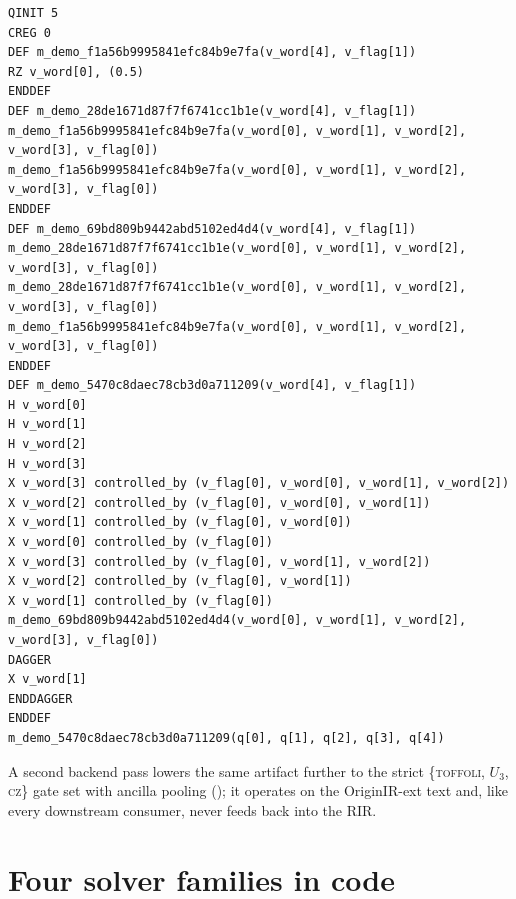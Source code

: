 \begin{lstlisting}[style=pyqir, caption={OriginIR-ext export (verbatim \texttt{export\_originir} output) of the module \texttt{demo\{word: UInt(4), flag: Bits(1)\}} that applies \texttt{h} to \texttt{word}, adds the constant 3 under control of \texttt{flag}, repeats \texttt{rz(0.5)} on \texttt{word[0]} five times, and adjoints \texttt{x} on \texttt{word[1]}.  The three \texttt{m\_demo\_*} definitions are the logarithmic chain for count 5; note the propagated \texttt{v\_flag[0]} argument replacing per-gate controls inside called modules.}, label={lst:originir-lowered}]
QINIT 5
CREG 0
DEF m_demo_f1a56b9995841efc84b9e7fa(v_word[4], v_flag[1])
RZ v_word[0], (0.5)
ENDDEF
DEF m_demo_28de1671d87f7f6741cc1b1e(v_word[4], v_flag[1])
m_demo_f1a56b9995841efc84b9e7fa(v_word[0], v_word[1], v_word[2], v_word[3], v_flag[0])
m_demo_f1a56b9995841efc84b9e7fa(v_word[0], v_word[1], v_word[2], v_word[3], v_flag[0])
ENDDEF
DEF m_demo_69bd809b9442abd5102ed4d4(v_word[4], v_flag[1])
m_demo_28de1671d87f7f6741cc1b1e(v_word[0], v_word[1], v_word[2], v_word[3], v_flag[0])
m_demo_28de1671d87f7f6741cc1b1e(v_word[0], v_word[1], v_word[2], v_word[3], v_flag[0])
m_demo_f1a56b9995841efc84b9e7fa(v_word[0], v_word[1], v_word[2], v_word[3], v_flag[0])
ENDDEF
DEF m_demo_5470c8daec78cb3d0a711209(v_word[4], v_flag[1])
H v_word[0]
H v_word[1]
H v_word[2]
H v_word[3]
X v_word[3] controlled_by (v_flag[0], v_word[0], v_word[1], v_word[2])
X v_word[2] controlled_by (v_flag[0], v_word[0], v_word[1])
X v_word[1] controlled_by (v_flag[0], v_word[0])
X v_word[0] controlled_by (v_flag[0])
X v_word[3] controlled_by (v_flag[0], v_word[1], v_word[2])
X v_word[2] controlled_by (v_flag[0], v_word[1])
X v_word[1] controlled_by (v_flag[0])
m_demo_69bd809b9442abd5102ed4d4(v_word[0], v_word[1], v_word[2], v_word[3], v_flag[0])
DAGGER
X v_word[1]
ENDDAGGER
ENDDEF
m_demo_5470c8daec78cb3d0a711209(q[0], q[1], q[2], q[3], q[4])
\end{lstlisting}

A second backend pass lowers the same artifact further to the strict
\{\textsc{toffoli}, $U_3$, \textsc{cz}\} gate set with ancilla pooling
(); it operates on the OriginIR-ext text and,
like every downstream consumer, never feeds back into the RIR.


\section{Four solver families in code}
\label{app:families}

